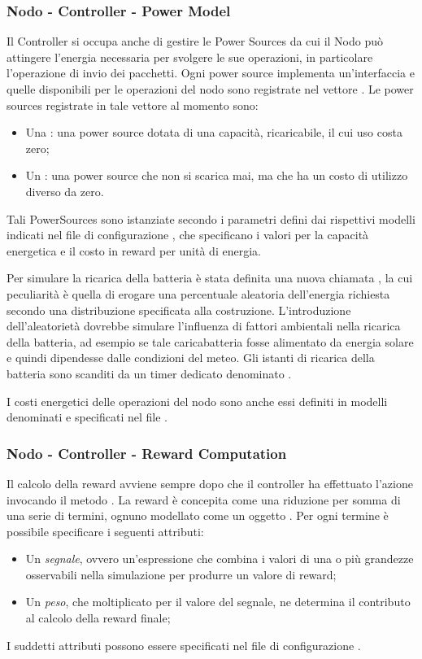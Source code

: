 \documentclass[conference]{IEEEtran}
\begin{document}
\subsubsection{Nodo - Controller - Power Model}
Il Controller si occupa anche di gestire le Power Sources da cui il Nodo può attingere
l'energia necessaria per svolgere le sue operazioni, in particolare l'operazione di 
invio dei pacchetti. Ogni power source implementa un'interfaccia 
e quelle disponibili per le operazioni del nodo sono registrate nel vettore
. Le power sources registrate in tale vettore al momento sono: 
\begin{itemize}
    \item Una : una power source dotata di una capacità, ricaricabile, il
    cui uso costa zero;
    \item Un : una power source che non si scarica mai, ma che ha un
    costo di utilizzo diverso da zero.
\end{itemize}
Tali PowerSources sono istanziate secondo i parametri defini dai rispettivi modelli
indicati nel file di configurazione , che specificano
i valori per la capacità energetica e il costo in reward per unità di energia.

Per simulare la ricarica della batteria è stata definita una nuova 
chiamata , la cui peculiarità è quella di erogare una percentuale
aleatoria dell'energia richiesta secondo una distribuzione specificata alla costruzione.
L'introduzione dell'aleatorietà dovrebbe simulare l'influenza di fattori ambientali
nella ricarica della batteria, ad esempio se tale caricabatteria fosse alimentato da
energia solare e quindi dipendesse dalle condizioni del meteo. Gli istanti di ricarica
della batteria sono scanditi da un timer dedicato denominato
.

I costi energetici delle operazioni del nodo sono anche essi definiti in modelli 
denominati  e specificati nel file . 

\subsubsection{Nodo - Controller - Reward Computation}

Il calcolo della reward avviene sempre dopo che il controller ha effettuato l'azione
invocando il metodo .
La reward è concepita come una riduzione per somma di una serie di termini, ognuno
modellato come un oggetto . Per ogni termine è possibile specificare
i seguenti attributi:
\begin{itemize}
    \item Un \textit{segnale}, ovvero un'espressione che combina i valori di una o più grandezze osservabili nella simulazione per produrre un valore di reward;
    \item Un \textit{peso}, che moltiplicato per il valore del segnale, ne determina il
    contributo al calcolo della reward finale;
\end{itemize}
I suddetti attributi possono essere specificati nel file di configurazione
.
\end{document}
